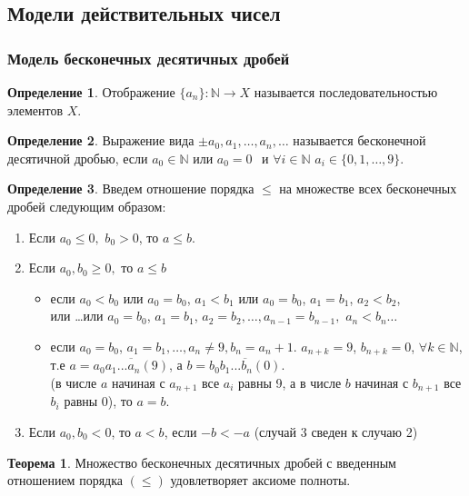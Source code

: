 \documentclass[a4paper, 12pt]{article}
\newcommand{\N}{\mathbb{N}}
\theoremstyle{definition}
\newtheorem*{definition}{Определение}
\newtheorem*{theorem}{Теорема}
\begin{document}
    \subsection{Модели действительных чисел}
    \subsubsection{Модель бесконечных десятичных дробей}
        \begin{definition}
            Отображение $\{a_n\}: \N \to X$ называется последовательностью элементов $X$.
        \end{definition}
        \begin{definition}
            Выражение вида $\pm a_0,a_1,\dots, a_n, \dots$ называется бесконечной десятичной дробью, если $a_0\in \N$ или $a_0=0 \hspace{5pt}$ и $\forall i\in \N$ $a_i \in \{0,1,\dots, 9\}$.
        \end{definition}
        \begin{definition}
            Введем отношение порядка $\leq$ на множестве всех бесконечных дробей следующим образом:
            \begin{enumerate}
                \item Если $a_0\leq 0,$ $b_0>0$, то $a\leq b$.
                \item Если $a_0, b_0\geq 0,$ то $a\leq b$
                \begin{itemize}
                    \item если $a_0<b_0$ или $a_0=b_0$, $a_1<b_1$ или $a_0=b_0$, $a_1=b_1$, $a_2<b_2$,\\ или \dots или $a_0=b_0$, $a_1=b_1$, $a_2=b_2, \dots, a_{n-1}=b_{n-1},$ $a_n<b_n\dots$
                    \item если $a_0=b_0$, $a_1=b_1, \dots, a_n\ne 9, b_n=a_{n}+1$.
                    $a_{n+k}=9$, $b_{n+k}=0$, $\forall k \in \N$, т.е $a=\overline{a_0a_1...a_n(9)}$, а $b=\overline{b_0b_1...b_n(0)}$.\\
                    (в числе $a$ начиная с $a_{n+1}$ все $a_i$ равны 9, а в числе $b$ начиная с $b_{n+1}$ все $b_i$ равны 0), то $a=b$.
                \end{itemize}
                \item Если $a_0, b_0<0$, то $a<b$, если $-b<-a$ (случай 3 сведен к случаю 2)
            \end{enumerate}
        \end{definition} 
        \begin{theorem}
            Множество бесконечных десятичных дробей с введенным отношением порядка $(\leq)$ удовлетворяет аксиоме полноты.
        \end{theorem} 
\end{document}

